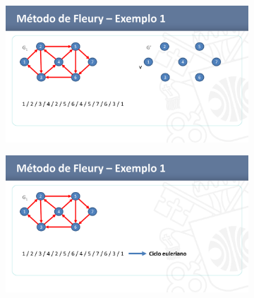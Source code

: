 \begin{figure}[H]
	\begin{subfigure}{.6\textwidth}
		\centering
		\includegraphics[width=\textwidth]{imagem/graficos/1a1455b7b9174768d1c6a0d41673e79dHTztESkzBtQzsXWu-49.png}
	\end{subfigure}
	\begin{subfigure}{.6\textwidth}
		\centering
		\includegraphics[width=\textwidth]{imagem/graficos/1a1455b7b9174768d1c6a0d41673e79dHTztESkzBtQzsXWu-50.png}
	\end{subfigure}
\end{figure}
